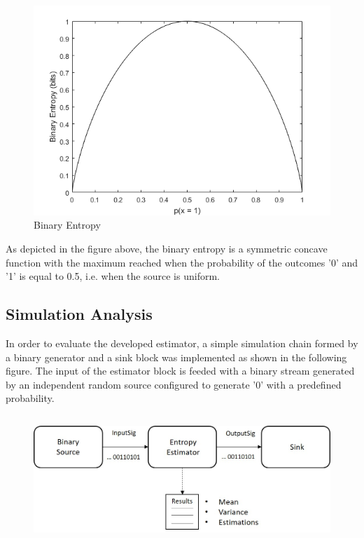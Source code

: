\begin{refsection}
\begin{figure}[h]
\subsection*{}
    \centerline{
       \includegraphics[scale=0.50]{figures/bin_entropy_th.png}
    }
    \caption{Binary Entropy}
\end{figure}

As depicted in the figure above, the binary entropy is a symmetric concave function with the maximum reached when the
probability of the outcomes '0' and '1' is equal to 0.5, i.e. when the source is uniform.  
	 
	 
\subsection{Simulation Analysis}

In order to evaluate the developed estimator, a simple simulation chain formed by a binary generator and a sink block
was implemented as shown in the following figure. The input of the estimator block is feeded with a binary stream
generated by an independent random source configured to generate '0' with a predefined probability.  

\begin{figure}[h]
\subsection*{}
    \centerline{
       \includegraphics[scale=0.55]{figures/system_block_diagram.jpg}
    }
\end{figure}


\end{refsection}
